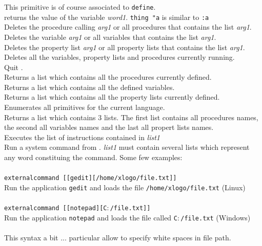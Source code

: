 This primitive is of course associated to \texttt{define}.\\
returns the value of the variable \textit{word1}. \texttt{thing "a} is similar to \texttt{:a}\\
 Deletes the procedure calling \textit{arg1} or all procedures that contains the list \textit{arg1}.\\
 Deletes the variable \textit{arg1} or all variables that contains the list \textit{arg1}.\\
 Deletes the property list \textit{arg1} or all property lists that contains the list \textit{arg1}.\\
Deletes all the variables, property lists and procedures currently running.\\
Quit \xlogo.\\
Returns a list which contains all the procedures currently defined.\\
Returns a list which contains all the defined variables.\\
Returns a list which contains all the property lists currently defined.\\
Enumerates all primitives for the current language.\\
Returns a list which contains 3 lists. The first list contains all procedures names, the second all variables names and the last all propert lists names.\\
Executes the list of instructions contained in \textit{list1} \\
Run a system command from \xlogo. \textit{list1} must contain several lists which represent any word constituing the command. Some few examples:\\ \\
\texttt{externalcommand [[gedit][/home/xlogo/file.txt]]}\\
Run the application \texttt{gedit} and loads the file \texttt{/home/xlogo/file.txt} (Linux)\\ \\
\texttt{externalcommand [[notepad][C$\colon$/file.txt]]}\\
Run the application \texttt{notepad} and loads the file called \texttt{C$\colon$/file.txt} (Windows)\\ \\
This syntax a bit ... particular allow to specify white spaces in file path.
